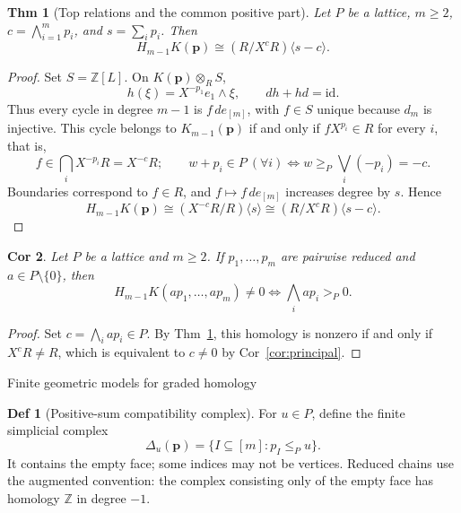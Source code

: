 \documentclass[10pt,letterpaper]{amsart}
\makeatletter
\numberwithin{equation}{section}
\newtheorem{thm}{Thm}[section]
\newtheorem{cor}[thm]{Cor}
\theoremstyle{definition}
\newtheorem{defn}{Def}[section]
\newcommand{\Z}{\mathbb Z}
\newcommand{\id}{\mathrm{id}}
\newcommand{\sh}[1]{\langle #1\rangle}
\def\subsection{\@startsection{subsection}{2}
  \z@{.9\linespacing\@plus.3\linespacing}{.4\linespacing}
  {\normalfont\fontsize{11.5}{14}\selectfont\bfseries\boldmath\raggedright}}
\makeatother
\begin{document}
\begin{thm}[Top relations and the common positive part]\label{thm:top-koszul}
Let $P$ be a lattice, $m\ge2$, $c=\bigwedge_{i=1}^m p_i$, and $s=\sum_i p_i$. Then
\[
H_{m-1}K(\mathbf p)\cong(R/X^cR)\sh{s-c}.
\]
\end{thm}
\begin{proof}
Set $S=\Z[L]$. On $K(\mathbf p)\otimes_RS$,
\[
h(\xi)=X^{-p_1}e_1\wedge\xi,\qquad dh+hd=\id.
\]
Thus every cycle in degree $m-1$ is $f\,de_{[m]}$, with $f\in S$ unique because $d_m$ is injective.
This cycle belongs to $K_{m-1}(\mathbf p)$ if and only if $fX^{p_i}\in R$ for every $i$, that is,
\[
f\in\bigcap_iX^{-p_i}R=X^{-c}R;
\qquad w+p_i\in P\ (\forall i)\iff w\ge_P\bigvee_i(-p_i)=-c.
\]
Boundaries correspond to $f\in R$, and $f\mapsto f\,de_{[m]}$ increases degree by $s$. Hence
\[
H_{m-1}K(\mathbf p)\cong(X^{-c}R/R)\sh s
\cong(R/X^cR)\sh{s-c}.
\]
\end{proof}

\begin{cor}\label{cor:top-mixing}
Let $P$ be a lattice and $m\ge2$. If $p_1,\ldots,p_m$ are pairwise reduced and $a\in P\setminus\{0\}$, then
\[
H_{m-1}K(ap_1,\ldots,ap_m)\ne0
\iff \bigwedge_i ap_i>_P0.
\]
\end{cor}
\begin{proof}
Set $c=\bigwedge_iap_i\in P$. By Thm~\ref{thm:top-koszul}, this homology is nonzero if and only if $X^cR\ne R$, which is equivalent to $c\ne0$ by Cor~\ref{cor:principal}.
\end{proof}

\subsection{Finite geometric models for graded homology}
\begin{defn}[Positive-sum compatibility complex]\label{def:delta}
For $u\in P$, define the finite simplicial complex
\[
\Delta_u(\mathbf p)=\{I\subseteq[m]:p_I\le_Pu\}.
\]
It contains the empty face; some indices may not be vertices. Reduced chains use the augmented convention: the complex consisting only of the empty face has homology $\Z$ in degree $-1$.
\end{defn}
\end{document}
